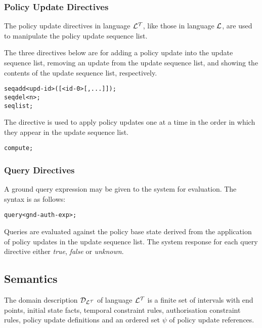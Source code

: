 \documentclass[11pt]{report}
\newenvironment{vverbatim}
{
  \begin{alltt}
}
{
  \vspace{-\baselineskip}
  \end{alltt}
}
\begin{document}
        \subsubsection{Policy Update Directives}

          The policy update directives in language ${\cal L^T}$, like those
          in language ${\cal L}$, are used to manipulate the policy update
          sequence list.

          The three directives below are for adding a policy update into the
          update sequence list, removing an update from the update sequence
          list, and showing the contents of the update sequence list,
          respectively.

          \begin{vverbatim}
  seq add <upd-id>([<id-0>[, ...]]);
  seq del <n>;
  seq list;
          \end{vverbatim}

          The directive is used to apply policy updates one at a time in the
          order in which they appear in the update sequence list.

          \begin{vverbatim}
  compute;
          \end{vverbatim}

        \subsubsection{Query Directives}

          A ground query expression may be given to the system for evaluation.
          The syntax is as follows:

          \begin{vverbatim}
  query <gnd-auth-exp>;
          \end{vverbatim}

          Queries are evaluated against the policy base state derived from the
          application of policy updates in the update sequence list. The system
          response for each query directive either {\em true}, {\em false} or
          {\em unknown}.

      \subsection{Semantics}

        The domain description ${\cal D_{L^T}}$ of language ${\cal L^T}$ is
        a finite set of intervals with end points, initial state facts,
        temporal constraint rules, authorisation constraint rules, policy
        update definitions and an ordered set $\psi$ of policy update
        references.
\end{document}
